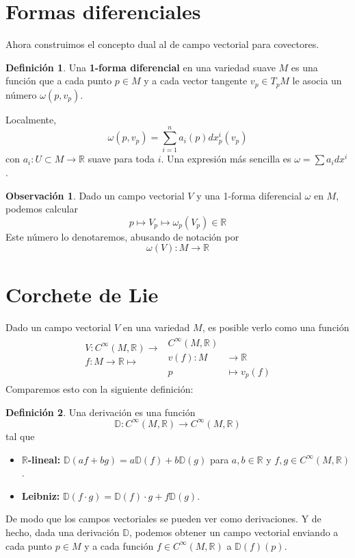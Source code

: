 \documentclass[spanish]{book}
\theoremstyle{definition}
\newtheorem*{defn}{Definición}
\newtheorem*{obs}{Observación}
\newcommand{\R}{\mathbb{R}}
\newcommand{\Cinf}{C^\infty}
\begin{document}
\section{Formas diferenciales}\label{sec:formas-dif}
Ahora construimos el concepto dual al de campo vectorial para covectores.
\begin{defn}
	Una \textbf{1-forma diferencial} en una variedad suave $M$ es una función que a cada punto $p\in M$ y a cada vector tangente $v_p\in T_pM$ le asocia un número $\omega(p,v_p)$.
\end{defn}
Localmente,
\[\omega(p,v_p)=\sum_{i=1}^na_i(p)dx^i_p(v_p)\]
con $a_i:U\subset M\to\R$ suave para toda $i$. Una expresión más sencilla es $\omega=\sum a_idx^i$.
\begin{obs}
	Dado un campo vectorial $V$ y una 1-forma diferencial $\omega$ en $M$, podemos calcular
	\[p\mapsto V_p\mapsto\omega_p(V_p)\in\R\]
	Este número lo denotaremos, abusando de notación por
	\[\omega(V):M\to\R\]
\end{obs}

\section{Corchete de Lie}
Dado un campo vectorial $V$ en una variedad $M$, es posible verlo como una función
\begin{align*}
	\begin{aligned}
		V:\Cinf(M,\R)\longrightarrow\\
		f:M\to\R\mapsto\\\\
	\end{aligned}
	\begin{aligned}
		\Cinf(M,\R)\\
		v(f):M&\to\R\\
		p&\mapsto v_p(f)
	\end{aligned}
\end{align*}
Comparemos esto con la siguiente definición:
\begin{defn}
	Una derivación es una función
	\[\mathbb{D}:\Cinf(M,\R)\to\Cinf(M,\R)\]
	tal que
	\begin{itemize}
		\item \textbf{$\R$-lineal:} $\mathbb{D}(af+bg)=a\mathbb{D}(f)+b\mathbb{D}(g)$ para $a,b\in\R$ y $f,g\in\Cinf(M,\R)$.
		\item \textbf{Leibniz:} $\mathbb{D}(f\cdot g)=\mathbb{D}(f)\cdot g+f\mathbb{D}(g)$.
	\end{itemize}
\end{defn}
De modo que los campos vectoriales se pueden ver como derivaciones. Y de hecho, dada una derivación $\mathbb{D}$, podemos obtener un campo vectorial enviando a cada punto $p\in M$ y a cada función $f\in\Cinf(M,\R)$ a $\mathbb{D}(f)(p)$.
\end{document}
